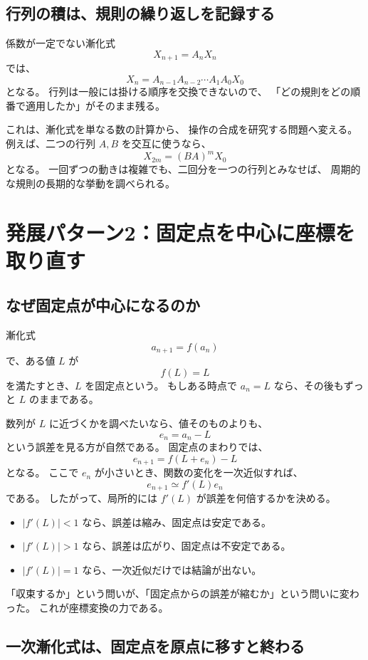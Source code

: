 \subsection{行列の積は、規則の繰り返しを記録する}

係数が一定でない漸化式
\[
  X_{n+1}=A_nX_n
\]
では、
\[
  X_n=A_{n-1}A_{n-2}\cdots A_1A_0X_0
\]
となる。
行列は一般には掛ける順序を交換できないので、
「どの規則をどの順番で適用したか」がそのまま残る。

これは、漸化式を単なる数の計算から、
操作の合成を研究する問題へ変える。
例えば、二つの行列 $A,B$ を交互に使うなら、
\[
  X_{2m}=(BA)^mX_0
\]
となる。
一回ずつの動きは複雑でも、二回分を一つの行列とみなせば、
周期的な規則の長期的な挙動を調べられる。

\section{発展パターン2：固定点を中心に座標を取り直す}

\subsection{なぜ固定点が中心になるのか}

漸化式
\[
  a_{n+1}=f(a_n)
\]
で、ある値 $L$ が
\[
  f(L)=L
\]
を満たすとき、$L$ を固定点という。
もしある時点で $a_n=L$ なら、その後もずっと $L$ のままである。

数列が $L$ に近づくかを調べたいなら、値そのものよりも、
\[
  e_n=a_n-L
\]
という誤差を見る方が自然である。
固定点のまわりでは、
\[
  e_{n+1}=f(L+e_n)-L
\]
となる。
ここで $e_n$ が小さいとき、関数の変化を一次近似すれば、
\[
  e_{n+1}\simeq f'(L)e_n
\]
である。
したがって、局所的には $f'(L)$ が誤差を何倍するかを決める。

\begin{itemize}
  \item $|f'(L)|<1$ なら、誤差は縮み、固定点は安定である。
  \item $|f'(L)|>1$ なら、誤差は広がり、固定点は不安定である。
  \item $|f'(L)|=1$ なら、一次近似だけでは結論が出ない。
\end{itemize}

「収束するか」という問いが、「固定点からの誤差が縮むか」という問いに変わった。
これが座標変換の力である。

\subsection{一次漸化式は、固定点を原点に移すと終わる}

